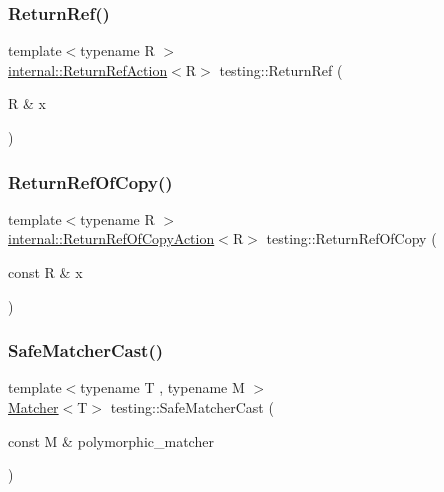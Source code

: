 \mbox{\label{namespacetesting_a18eda8fe9c89ee856c199a2e04ca1641}} 
\subsubsection{\texorpdfstring{Return\+Ref()}{ReturnRef()}}
{\footnotesize\ttfamily template$<$typename R $>$ \\
\hyperlink{classtesting_1_1internal_1_1_return_ref_action}{internal\+::\+Return\+Ref\+Action}$<$R$>$ testing\+::\+Return\+Ref (\begin{DoxyParamCaption}\item[{R \&}]{x }\end{DoxyParamCaption})\hspace{0.3cm}{\ttfamily [inline]}}

\mbox{\label{namespacetesting_ac1b75444c89371dc25ebcfcc48336201}} 
\subsubsection{\texorpdfstring{Return\+Ref\+Of\+Copy()}{ReturnRefOfCopy()}}
{\footnotesize\ttfamily template$<$typename R $>$ \\
\hyperlink{classtesting_1_1internal_1_1_return_ref_of_copy_action}{internal\+::\+Return\+Ref\+Of\+Copy\+Action}$<$R$>$ testing\+::\+Return\+Ref\+Of\+Copy (\begin{DoxyParamCaption}\item[{const R \&}]{x }\end{DoxyParamCaption})\hspace{0.3cm}{\ttfamily [inline]}}

\mbox{\label{namespacetesting_ac016ac22aa065a19b9ef95f0ccffc17b}} 
\subsubsection{\texorpdfstring{Safe\+Matcher\+Cast()}{SafeMatcherCast()}}
{\footnotesize\ttfamily template$<$typename T , typename M $>$ \\
\hyperlink{classtesting_1_1_matcher}{Matcher}$<$T$>$ testing\+::\+Safe\+Matcher\+Cast (\begin{DoxyParamCaption}\item[{const M \&}]{polymorphic\+\_\+matcher }\end{DoxyParamCaption})\hspace{0.3cm}{\ttfamily [inline]}}

